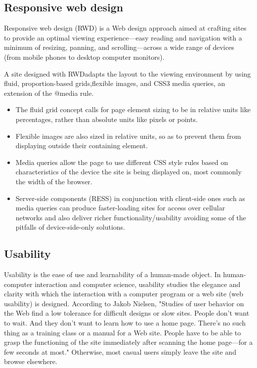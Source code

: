 \subsection {Responsive web design}
	Responsive web design (RWD)\cite{ wiki:RWD, CSS3} is a Web design approach aimed at crafting sites to provide an optimal viewing experience—easy reading and navigation with a minimum of resizing, panning, and scrolling—across a wide range of devices (from mobile phones to desktop computer monitors).

	A site designed with RWD\cite{pettit, ethan}adapts the layout to the viewing environment by using fluid, proportion-based grids,flexible images, and CSS3 media queries, an extension of the @media rule.
    \begin{itemize}
	\item The fluid grid concept calls for page element sizing to be in relative units like percentages, rather than absolute units like pixels or points. 
	\item Flexible images are also sized in relative units, so as to prevent them from displaying outside their containing element. 
	\item Media queries allow the page to use different CSS style rules based on characteristics of the device the site is being displayed on, most commonly the width of the browser. 
	\item Server-side components (RESS) in conjunction with client-side ones such as media queries can produce faster-loading sites for access over cellular networks and also deliver richer functionality/usability avoiding some of the pitfalls of device-side-only solutions.
	\end{itemize}

\subsection {Usability}
     Usability is the ease of use and learnability of a human-made object. In human-computer interaction and computer science, usability studies the elegance and clarity with which the interaction with a computer program or a web site (web usability) is designed.
	 According to Jakob Nielsen, "Studies of user behavior on the Web find a low tolerance for difficult designs or slow sites. People don't want to wait. And they don't want to learn how to use a home page. There's no such thing as a training class or a manual for a Web site. People have to be able to grasp the functioning of the site immediately after scanning the home page—for a few seconds at most."\cite{wiki:usability} Otherwise, most casual users simply leave the site and browse elsewhere.

